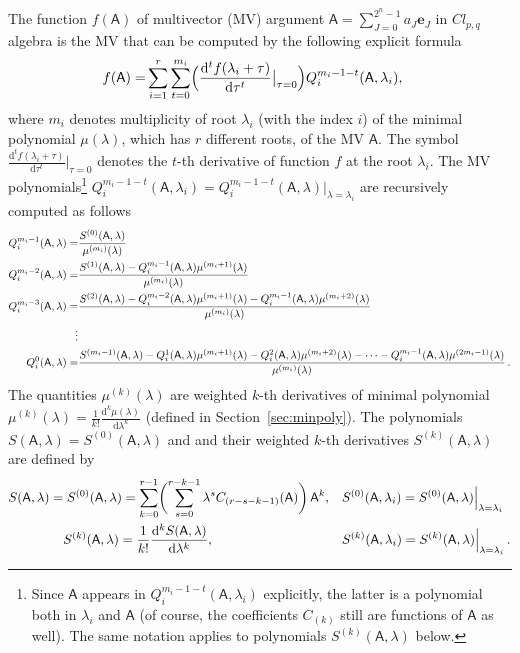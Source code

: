\documentclass[AMA,STIX1COL]{WileyNJD-v2}
\def\m#1{\mathsf{#1}} %
\newcommand{\cl}[2]{\ensuremath{\mathit{Cl}_{#1,#2}}}
\newcommand{\dd}{\mathrm{d}} %
\def\m#1{\mathsf{#1}}%
\def\e#1{\mathbf{e}_{#1}} %
\begin{document}
\begin{theorem}\label{theoremMain}
The function $f(\m{A})$ of multivector (MV) argument
$\m{A}=\sum_{J=0}^{2^n-1}a_J\e{J}$ in $\cl{p}{q}$ algebra is the
MV that can be computed by the following explicit formula
\begin{align}\label{funcCoordFree}
f(\m{A})=
  & \sum_{i=1}^{r}\sum_{t=0}^{m_i} \Bigl(\frac{\dd^{t} f(\lambda_i+\tau)}{\dd \tau^t}\big\vert_{\tau=0}\Bigr) Q^{m_i-1-t}_i(\m{A},\lambda_i),
\end{align}
  where $m_i$ denotes multiplicity of root $\lambda_i$ (with the index $i$) of the minimal polynomial $\mu(\lambda)$, which
  has $r$ different roots, of the  MV $\m{A}$. The symbol $\frac{\dd^{t} f(\lambda_i+\tau)}{\dd \tau^t}\big\vert_{\tau=0}$
  denotes the $t$-th derivative of function $f$ at the root $\lambda_i$.
  The MV polynomials\footnote{Since $\m{A}$  appears in $Q^{m_i-1-t}_i(\m{A},\lambda_i)$ explicitly,
  the latter is a polynomial both in $\lambda_i$ and $\m{A}$ (of course, the coefficients $C_{(k)}$ still are
  functions of $\m{A}$ as well). The same notation applies to polynomials $S^{(k)}(\m{A},\lambda)$ below.}
  $Q^{m_i-1-t}_i(\m{A},\lambda_i)=Q_i^{m_i-1-t}(\m{A},\lambda)\vert_{\lambda=\lambda_i}$ are recursively computed as
  follows
  \begin{align}\label{recursionQ}
  Q_i^{m_i-1}(\m{A},\lambda)=&\frac{S^{(0)}(\m{A},\lambda)}{\mu^{(m_i)}(\lambda)}
    \notag\\
  Q_i^{m_i-2}(\m{A},\lambda)=&\frac{S^{(1)}(\m{A},\lambda)- Q_i^{m_i-1}(\m{A},\lambda)\mu^{(m_i+1)}(\lambda)}{\mu^{(m_i)}(\lambda)}
  \notag\\
  Q_i^{m_i-3}(\m{A},\lambda)=&\frac{S^{(2)}(\m{A},\lambda)- Q_i^{m_i-2}(\m{A},\lambda)\mu^{(m_i+1)}(\lambda)- Q_i^{m_i-1}(\m{A},\lambda)\mu^{(m_i+2)}(\lambda)}{\mu^{(m_i)}(\lambda)}
  \notag\\ \vdots\notag\\
  Q_i^{0}(\m{A},\lambda)=&\frac{S^{(m_i-1)}(\m{A},\lambda)- Q_i^{1}(\m{A},\lambda)\mu^{(m_i+1)}(\lambda)- Q_i^{2}(\m{A},\lambda)\mu^{(m_i+2)}(\lambda)-\cdots -Q_i^{m_i-1}(\m{A},\lambda)\mu^{(2m_i-1)}(\lambda)}{\mu^{(m_i)}(\lambda)}
  \,.
\end{align}
The quantities $\mu^{(k)}(\lambda)$ are weighted $k$-th
  derivatives of minimal polynomial $\mu^{(k)}(\lambda)=\frac{1}{k!}\frac{\dd^k \mu(\lambda)}{\dd
  \lambda^k}$ (defined in Section~\ref{sec:minpoly}). The polynomials $S(\m{A},\lambda)=S^{(0)}(\m{A},\lambda)$
and and their weighted $k$-th derivatives $S^{(k)}(\m{A},\lambda)$ are defined by
  \begin{align}\label{formulasS}
  &S(\m{A},\lambda)=S^{(0)}(\m{A},\lambda)=\sum_{k=0}^{r-1} \biggl(\sum_{s=0}^{r-k-1}\lambda^s C_{(r-s-k-1)}(\m{A})\biggr)\, \m{A}^{k}, &&S^{(0)}(\m{A},\lambda_i)=S^{(0)}(\m{A},\lambda)\Big\vert_{\lambda=\lambda_i}\notag \\
  &\phantom{S(\m{A},\lambda)=}S^{(k)}(\m{A},\lambda)=\frac{1}{k!}\frac{\dd^k S(\m{A},\lambda)}{\dd \lambda^k},&&S^{(k)}(\m{A},\lambda_i)=S^{(k)}(\m{A},\lambda)\Big\vert_{\lambda=\lambda_i}\, .
\end{align}
\end{theorem}
\end{document}

